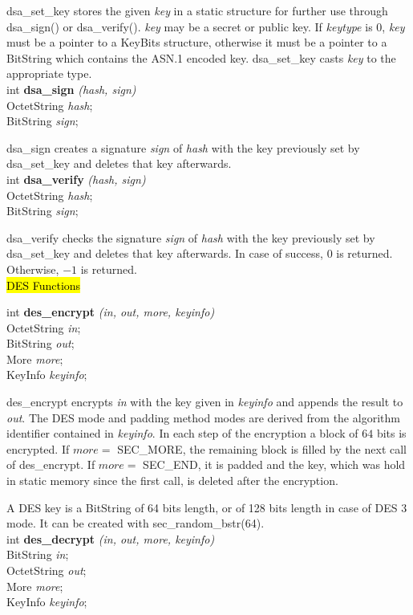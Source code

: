 dsa\_set\_key stores the given {\em key} in a static
structure for further use through dsa\_sign() or dsa\_verify().
{\em key} may be a secret or public key. If {\em keytype} is 0, {\em key} must be a pointer to a KeyBits structure, otherwise it must be a pointer to a BitString which
contains the ASN.1 encoded key. dsa\_set\_key casts {\em key} to the appropriate type.
\\ [1ex]


int {\bf dsa\_sign} {\em (hash, sign)} \\
OctetString {\em *hash}; \\
BitString {\em *sign}; 

dsa\_sign creates a signature {\em sign} of {\em hash} with the key previously set by dsa\_set\_key
and deletes that key afterwards.
\\ [1ex]


int {\bf dsa\_verify} {\em (hash, sign)} \\
OctetString {\em *hash}; \\
BitString {\em *sign}; 

dsa\_verify checks the signature {\em sign} of {\em hash} with the key previously set by dsa\_set\_key
and deletes that key afterwards. In case of success, $0$ is returned. Otherwise, $-1$
is returned.
\\ [1ex]


\hl{DES Functions}

int {\bf des\_encrypt} {\em (in, out, more, keyinfo)} \\
OctetString {\em *in}; \\
BitString {\em *out}; \\
More {\em more}; \\
KeyInfo {\em *keyinfo}; 

des\_encrypt encrypts {\em in} with the key given in {\em keyinfo} and appends the result
to {\em out}. The DES mode and padding method modes are derived from the algorithm identifier
contained in {\em keyinfo}.
In each step of the encryption a block of
$64$ bits is encrypted. If $more =$ SEC\_MORE,
the remaining block is filled by the next call of  des\_encrypt.
If $more =$ SEC\_END, it is padded and the key, which was hold in static memory since
the first call, is deleted after the encryption.

A DES key is a BitString of 64 bits length, or of 128 bits length in case of DES 3 mode.
It can be created with sec\_random\_bstr(64).
\\ [1ex]

int {\bf des\_decrypt} {\em (in, out, more, keyinfo)} \\
BitString {\em *in}; \\
OctetString {\em *out}; \\
More {\em more}; \\
KeyInfo {\em *keyinfo}; 

